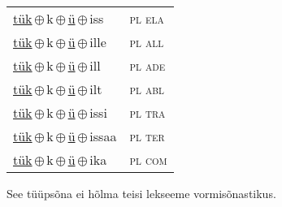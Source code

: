 \begin{minipage}{\textwidth}
\begin{sideways}
\begin{tabular}{l l}
\underline{tük}\,$\oplus$\,k\,$\oplus$\,\underline{ü}\,$\oplus$\,iss & \textsc{ pl ela } \\
\underline{tük}\,$\oplus$\,k\,$\oplus$\,\underline{ü}\,$\oplus$\,ille & \textsc{ pl all } \\
\underline{tük}\,$\oplus$\,k\,$\oplus$\,\underline{ü}\,$\oplus$\,ill & \textsc{ pl ade } \\
\underline{tük}\,$\oplus$\,k\,$\oplus$\,\underline{ü}\,$\oplus$\,ilt & \textsc{ pl abl } \\
\underline{tük}\,$\oplus$\,k\,$\oplus$\,\underline{ü}\,$\oplus$\,issi & \textsc{ pl tra } \\
\underline{tük}\,$\oplus$\,k\,$\oplus$\,\underline{ü}\,$\oplus$\,issaa & \textsc{ pl ter } \\
\underline{tük}\,$\oplus$\,k\,$\oplus$\,\underline{ü}\,$\oplus$\,ika & \textsc{ pl com } \\
\end{tabular}
\end{sideways}
\label{tab:tüüpsõnamall-tükkü}

\end{minipage}

 
\vspace{1em}
\noindent See tüüpsõna ei hõlma teisi lekseeme vormi\-sõnastikus.

